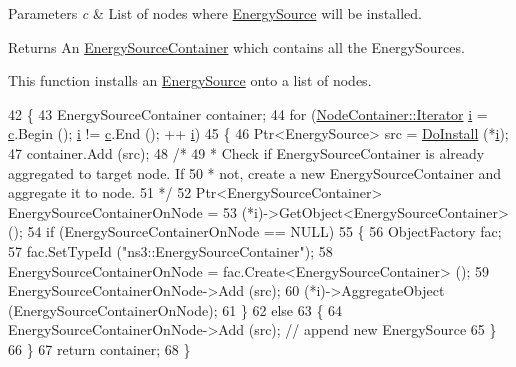 \begin{DoxyParams}{Parameters}
{\em c} & List of nodes where \hyperlink{classns3_1_1EnergySource}{Energy\+Source} will be installed. \\
\hline
\end{DoxyParams}
\begin{DoxyReturn}{Returns}
An \hyperlink{classns3_1_1EnergySourceContainer}{Energy\+Source\+Container} which contains all the Energy\+Sources.
\end{DoxyReturn}
This function installs an \hyperlink{classns3_1_1EnergySource}{Energy\+Source} onto a list of nodes. 
\begin{DoxyCode}
42 \{
43   EnergySourceContainer container;
44   \textcolor{keywordflow}{for} (\hyperlink{classns3_1_1NodeContainer_aa1a9f2d2b09bfef7d066d3974bca2cc4}{NodeContainer::Iterator} \hyperlink{bernuolliDistribution_8m_a6f6ccfcf58b31cb6412107d9d5281426}{i} = \hyperlink{lte_2model_2fading-traces_2fading__trace__generator_8m_ae0323a9039add2978bf5b49550572c7c}{c}.Begin (); \hyperlink{bernuolliDistribution_8m_a6f6ccfcf58b31cb6412107d9d5281426}{i} != \hyperlink{lte_2model_2fading-traces_2fading__trace__generator_8m_ae0323a9039add2978bf5b49550572c7c}{c}.End (); ++
      \hyperlink{bernuolliDistribution_8m_a6f6ccfcf58b31cb6412107d9d5281426}{i})
45     \{
46       Ptr<EnergySource> src = \hyperlink{classns3_1_1EnergySourceHelper_ad5c32ebe5ef2f9da5e2e46c2dd6acd87}{DoInstall} (*\hyperlink{bernuolliDistribution_8m_a6f6ccfcf58b31cb6412107d9d5281426}{i});
47       container.Add (src);
48       \textcolor{comment}{/*}
49 \textcolor{comment}{       * Check if EnergySourceContainer is already aggregated to target node. If}
50 \textcolor{comment}{       * not, create a new EnergySourceContainer and aggregate it to node.}
51 \textcolor{comment}{       */}
52       Ptr<EnergySourceContainer> EnergySourceContainerOnNode =
53         (*i)->GetObject<EnergySourceContainer> ();
54       \textcolor{keywordflow}{if} (EnergySourceContainerOnNode == NULL)
55         \{
56           ObjectFactory fac;
57           fac.SetTypeId (\textcolor{stringliteral}{"ns3::EnergySourceContainer"});
58           EnergySourceContainerOnNode = fac.Create<EnergySourceContainer> ();
59           EnergySourceContainerOnNode->Add (src);
60           (*i)->AggregateObject (EnergySourceContainerOnNode);
61         \}
62       \textcolor{keywordflow}{else}
63         \{
64           EnergySourceContainerOnNode->Add (src);  \textcolor{comment}{// append new EnergySource}
65         \}
66     \}
67   \textcolor{keywordflow}{return} container;
68 \}
\end{DoxyCode}


